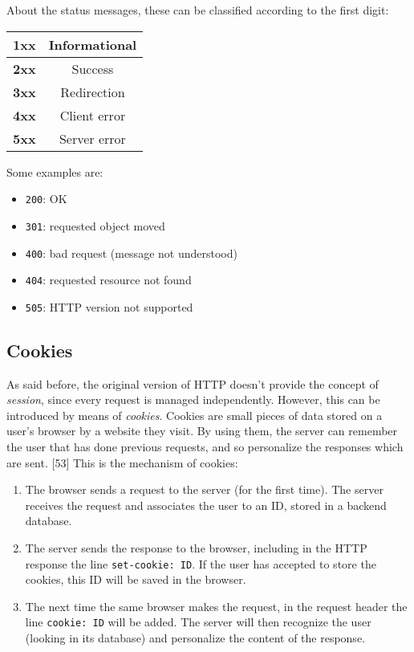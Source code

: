 About the status messages, these can be classified according to the first digit:
\begin{table}[h!]
    \centering
    \begin{tabular}{|c|c|}
    \hline
    \textbf{1xx} & Informational \\ \hline
    \textbf{2xx} & Success \\ \hline
    \textbf{3xx} & Redirection \\ \hline
    \textbf{4xx} & Client error \\ \hline
    \textbf{5xx} & Server error \\ \hline
    \end{tabular}
\end{table}

\noindent Some examples are:
\begin{itemize}
    \item \texttt{200}: OK
    \item \texttt{301}: requested object moved
    \item \texttt{400}: bad request (message not understood)
    \item \texttt{404}: requested resource not found
    \item \texttt{505}: HTTP version not supported
\end{itemize}

\subsection{Cookies}
As said before, the original version of HTTP doesn't provide the concept of \textit{session}, since every request is managed independently. However, this can be introduced by means of \textit{cookies}. Cookies are small pieces of data stored on a user's browser by a website they visit. By using them, the server can remember the user that has done previous requests, and so personalize the responses which are sent.
[53] This is the mechanism of cookies:
\begin{enumerate}
    \item The browser sends a request to the server (for the first time). The server receives the request and associates the user to an ID, stored in a backend database.
    \item The server sends the response to the browser, including in the HTTP response the line \texttt{set-cookie: ID}. If the user has accepted to store the cookies, this ID will be saved in the browser.
    \item The next time the same browser makes the request, in the request header the line \texttt{cookie: ID} will be added. The server will then recognize the user (looking in its database) and personalize the content of the response.
\end{enumerate}

